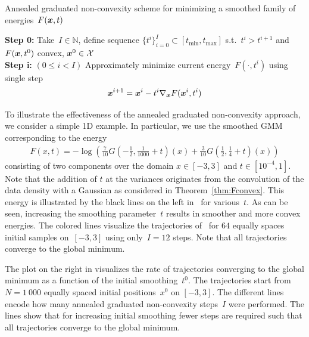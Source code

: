 \documentclass{article} %
\theoremstyle{plain}
\theoremstyle{definition}
\theoremstyle{remark}
\newcommand{\N}{\mathbb{N}}
\newcommand{\X}{\mathcal{X}}
\newcommand{\tmin}{t_\mathrm{min}}
\newcommand{\tmax}{t_\mathrm{max}}
\begin{document}
\begin{algorithm}[t]
\caption{Annealed graduated non-convexity scheme for minimizing a smoothed family of energies~$F({\bm{x}},t)$}\label{alg:graduatedNC}
\textbf{Step 0:} Take~$I\in\N$, define sequence $\{t^i\}_{i=0}^I\subset[\tmin,\tmax]$ s.t.~$t^{i}>t^{i+1}$ and~$F({\bm{x}},t^0)$ convex, $\vx^0\in\X$ \\
\textbf{Step i:} $(0\leq i< I)$ 
Approximately minimize current energy~$F(\cdot,t^i)$ using single step
\[
{\bm{x}}^{i+1}={\bm{x}}^i-t^i \nabla_{\bm{x}} F({\bm{x}}^i,t^i)
\] 
\end{algorithm}

To illustrate the effectiveness of the annealed graduated non-convexity approach, we consider a simple 1D example.
In particular, we use the smoothed GMM corresponding to the energy
\begin{align} \label{eq:gmmEx}
F(x,t)=-\log\left(\tfrac{7}{10}G\left(-\tfrac12,\tfrac{1}{1000}+t\right)(x)+\tfrac{3}{10}G\left(\tfrac12,\tfrac14+t\right)(x)\right)
\end{align}
consisting of two components over the domain $x\in[-3,3]$ and $t\in[10^{-4},1]$.
Note that the addition of $t$ at the variances originates from the convolution of the data density with a Gaussian as considered in Theorem~\ref{thm:Fconvex}.
This energy is illustrated by the black lines on the left in~ for various~$t$.
As can be seen, increasing the smoothing parameter~$t$ results in smoother and more convex energies.
The colored lines visualize the trajectories of~ for $64$ equally spaces initial samples on~$[-3,3]$ using only~$I=12$ steps.
Note that all trajectories converge to the global minimum.

The plot on the right in  visualizes the rate of trajectories converging to the global minimum as a function of the initial smoothing~$t^0$.
The trajectories start from~$N=1\ 000$ equally spaced initial positions~$x^0$ on $[-3,3]$.
The different lines encode how many annealed graduated non-convexity steps~$I$ were performed.
The lines show that for increasing initial smoothing fewer steps are required such that all trajectories converge to the global minimum.
\end{document}
